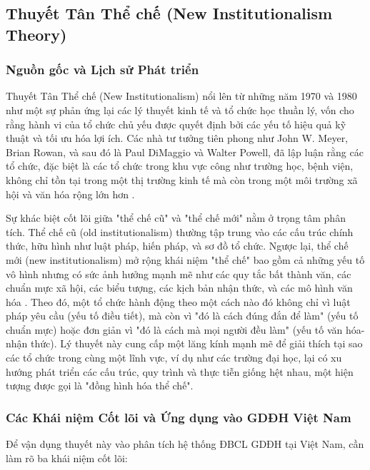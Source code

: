 \documentclass[12pt, a4paper, openany]{report}
\begin{document}
\subsection{Thuyết Tân Thể chế (New Institutionalism Theory)}
\label{subsec:tan_the_che_nen_teng}

\subsubsection{Nguồn gốc và Lịch sử Phát triển}
Thuyết Tân Thể chế (New Institutionalism) nổi lên từ những năm 1970 và 1980 như một sự phản ứng lại các lý thuyết kinh tế và tổ chức học thuần lý, vốn cho rằng hành vi của tổ chức chủ yếu được quyết định bởi các yếu tố hiệu quả kỹ thuật và tối ưu hóa lợi ích. Các nhà tư tưởng tiên phong như John W. Meyer, Brian Rowan, và sau đó là Paul DiMaggio và Walter Powell, đã lập luận rằng các tổ chức, đặc biệt là các tổ chức trong khu vực công như trường học, bệnh viện, không chỉ tồn tại trong một thị trường kinh tế mà còn trong một môi trường xã hội và văn hóa rộng lớn hơn \cite{MeyerRowan1977, DiMaggioPowell1983}.

Sự khác biệt cốt lõi giữa "thể chế cũ" và "thể chế mới" nằm ở trọng tâm phân tích. Thể chế cũ (old institutionalism) thường tập trung vào các cấu trúc chính thức, hữu hình như luật pháp, hiến pháp, và sơ đồ tổ chức. Ngược lại, thể chế mới (new institutionalism) mở rộng khái niệm "thể chế" bao gồm cả những yếu tố vô hình nhưng có sức ảnh hưởng mạnh mẽ như các quy tắc bất thành văn, các chuẩn mực xã hội, các biểu tượng, các kịch bản nhận thức, và các mô hình văn hóa \cite{MeyerPowell2020}. Theo đó, một tổ chức hành động theo một cách nào đó không chỉ vì luật pháp yêu cầu (yếu tố điều tiết), mà còn vì "đó là cách đúng đắn để làm" (yếu tố chuẩn mực) hoặc đơn giản vì "đó là cách mà mọi người đều làm" (yếu tố văn hóa-nhận thức). Lý thuyết này cung cấp một lăng kính mạnh mẽ để giải thích tại sao các tổ chức trong cùng một lĩnh vực, ví dụ như các trường đại học, lại có xu hướng phát triển các cấu trúc, quy trình và thực tiễn giống hệt nhau, một hiện tượng được gọi là "đồng hình hóa thể chế".

\subsubsection{Các Khái niệm Cốt lõi và Ứng dụng vào GDĐH Việt Nam}

Để vận dụng thuyết này vào phân tích hệ thống ĐBCL GDĐH tại Việt Nam, cần làm rõ ba khái niệm cốt lõi:
\end{document}
